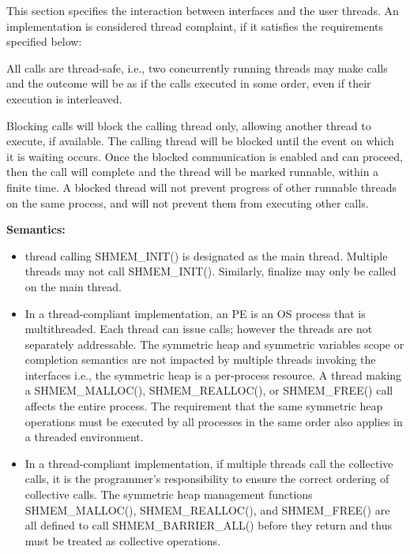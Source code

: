 This section specifies the interaction between \openshmem{} interfaces and the
user threads. An \openshmem{} implementation is considered thread complaint, if
it satisfies the requirements specified below:
                                      	
All \openshmem{} calls are thread-safe, i.e., two concurrently running threads
may make \openshmem{} calls and the outcome will be as if the calls executed in
some order, even if their execution is interleaved.

Blocking \openshmem{} calls will block the calling thread only, allowing another
thread to execute, if available. The calling thread will be blocked until the
event on which it is waiting occurs. Once the blocked communication is enabled
and can proceed, then the call will complete and the thread will be marked
runnable, within a finite time. A blocked thread will not prevent progress of
other runnable threads on the same process, and will not prevent them from
executing other \openshmem{} calls. 

{\bf Semantics:}

\begin{itemize}

\item
\openshmem{} thread calling SHMEM\_INIT() is designated as the main thread.
Multiple threads may not call SHMEM\_INIT(). Similarly, \openshmem{} finalize
may only be called on the main thread.
 
\item
In a thread-compliant implementation, an \openshmem{} PE is an OS process that
is multithreaded. Each thread can issue \openshmem{} calls; however the threads
are not separately addressable. The symmetric heap and symmetric variables scope
or completion semantics are not impacted by multiple threads invoking the
\openshmem{} interfaces i.e., the symmetric heap is a per-process resource. A
thread making a SHMEM\_MALLOC(), SHMEM\_REALLOC(), or SHMEM\_FREE() call affects
the entire process. The requirement that the same symmetric heap operations must
be executed by all processes in the same order also applies in a threaded
environment.
 
\item
In a thread-compliant implementation, if multiple threads call the collective
calls, it is the programmer's responsibility to ensure the correct ordering of
collective calls.  The symmetric heap management functions SHMEM\_MALLOC(),
SHMEM\_REALLOC(), and SHMEM\_FREE() are all defined to call
SHMEM\_BARRIER\_ALL() before they return and thus must be treated as collective
operations.

\end{itemize} 
 
